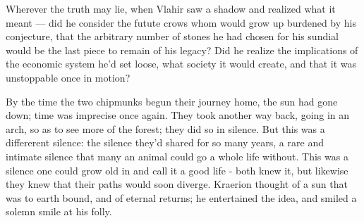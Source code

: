 Wherever the truth may lie, when Vlahir saw a shadow and realized what it meant — did he consider the futute crows whom would grow up burdened by his conjecture, that the arbitrary number of stones he had chosen for his sundial would be the last piece to remain of his legacy? 
Did he realize the implications of the economic system he'd set loose, what society it would create, and that it was unstoppable once in motion?

By the time the two chipmunks begun their journey home, the sun had gone down; time was imprecise once again. They took another way back, going in an arch, so as to see more of the forest; they did so in silence. But this was a differerent silence: the silence they'd shared for so many years, a rare and intimate silence that many an animal could go a whole life without. This was a silence one could grow old in and call it a good life - both knew it, but likewise they knew that their paths would soon diverge. 
Kraerion thought of a sun that was to earth bound, and of eternal returns; he entertained the idea, and smiled a solemn smile at his folly.







